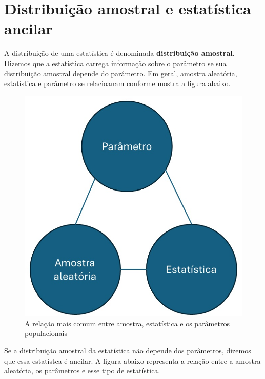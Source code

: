 \documentclass[
  letterpaper,
  DIV=11,
  numbers=noendperiod]{scrreprt}
\begin{document}
\section{Distribuição amostral e estatística
ancilar}\label{distribuiuxe7uxe3o-amostral-e-estatuxedstica-ancilar}

A distribuição de uma estatística é denominada \textbf{distribuição
amostral}. Dizemos que a estatística carrega informação sobre o
parâmetro se sua distribuição amostral depende do parâmetro. Em geral,
amostra aleatória, estatística e parâmetro se relacioanam conforme
mostra a figura abaixo.

\begin{figure}

{\centering \includegraphics{fig_stat_geral.jpg}

}

\caption{A relação mais comum entre amostra, estatística e os parâmetros
populacionais}

\end{figure}%

Se a distribuição amostral da estatística não depende dos parâmetros,
dizemos que essa estatístca é ancilar. A figura abaixo representa a
relação entre a amostra aleatória, os parâmetros e esse tipo de
estatística.
\end{document}
